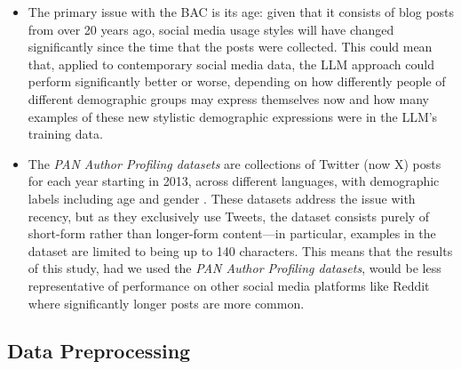 \documentclass{report}
\begin{document}
\begin{itemize}
\begin{enumerate}
\item The dataset is roughly well-balanced. In particular, each blog post is in one of roughly three age-ranges: teenagers aged 13-17, of which there are 8,240, young adults aged 23-27, of which there are 8,806 posts, and adults aged 33-47 of which there are 2,994. In each age group there are exactly the same number of men and women

\item The dataset contains both numeric and categorical data, with age being supplied as a number and gender being either ``male" or ``female". This means the experiment will be able to evaluate the LLMs in both a classification and a regression setting.
\end{enumerate}

\item The primary issue with the BAC is its age: given that it consists of blog posts from over 20 years ago, social media usage styles will have changed significantly since the time that the posts were collected. This could mean that, applied to contemporary social media data, the LLM approach could perform significantly better or worse, depending on how differently people of different demographic groups may express themselves now and how many examples of these new stylistic demographic expressions were in the LLM's training data.

\item The \textit{PAN Author Profiling datasets} are collections of Twitter (now X) posts for each year starting in 2013, across different languages, with demographic labels including age and gender \cite{PAN-age-gender-2013}. These datasets address the issue with recency, but as they exclusively use Tweets, the dataset consists purely of short-form rather than longer-form content—in particular, examples in the dataset are limited to being up to 140 characters. This means that the results of this study, had we used the \textit{PAN Author Profiling datasets}, would be less representative of performance on other social media platforms like Reddit where significantly longer posts are more common.
\end{itemize}

\subsection{Data Preprocessing}
\end{document}
